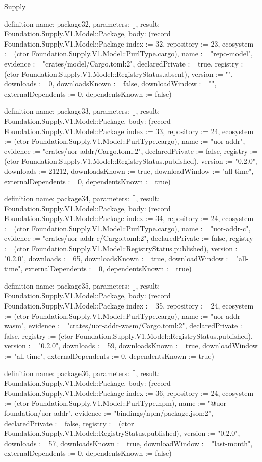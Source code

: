 \begin{lexlean}{Supply}
\begin{semanticmodule}
definition{
  name: package32,
  parameters: [],
  result: Foundation.Supply.V1.Model::Package,
  body: (record Foundation.Supply.V1.Model::Package {index := 32, repository := 23, ecosystem := (ctor Foundation.Supply.V1.Model::PurlType.cargo), name := "repo-model", evidence := "crates/model/Cargo.toml:2", declaredPrivate := true, registry := (ctor Foundation.Supply.V1.Model::RegistryStatus.absent), version := "", downloads := 0, downloadsKnown := false, downloadWindow := "", externalDependents := 0, dependentsKnown := false})
}

definition{
  name: package33,
  parameters: [],
  result: Foundation.Supply.V1.Model::Package,
  body: (record Foundation.Supply.V1.Model::Package {index := 33, repository := 24, ecosystem := (ctor Foundation.Supply.V1.Model::PurlType.cargo), name := "uor-addr", evidence := "crates/uor-addr/Cargo.toml:2", declaredPrivate := false, registry := (ctor Foundation.Supply.V1.Model::RegistryStatus.published), version := "0.2.0", downloads := 21212, downloadsKnown := true, downloadWindow := "all-time", externalDependents := 0, dependentsKnown := true})
}

definition{
  name: package34,
  parameters: [],
  result: Foundation.Supply.V1.Model::Package,
  body: (record Foundation.Supply.V1.Model::Package {index := 34, repository := 24, ecosystem := (ctor Foundation.Supply.V1.Model::PurlType.cargo), name := "uor-addr-c", evidence := "crates/uor-addr-c/Cargo.toml:2", declaredPrivate := false, registry := (ctor Foundation.Supply.V1.Model::RegistryStatus.published), version := "0.2.0", downloads := 65, downloadsKnown := true, downloadWindow := "all-time", externalDependents := 0, dependentsKnown := true})
}

definition{
  name: package35,
  parameters: [],
  result: Foundation.Supply.V1.Model::Package,
  body: (record Foundation.Supply.V1.Model::Package {index := 35, repository := 24, ecosystem := (ctor Foundation.Supply.V1.Model::PurlType.cargo), name := "uor-addr-wasm", evidence := "crates/uor-addr-wasm/Cargo.toml:2", declaredPrivate := false, registry := (ctor Foundation.Supply.V1.Model::RegistryStatus.published), version := "0.2.0", downloads := 59, downloadsKnown := true, downloadWindow := "all-time", externalDependents := 0, dependentsKnown := true})
}

definition{
  name: package36,
  parameters: [],
  result: Foundation.Supply.V1.Model::Package,
  body: (record Foundation.Supply.V1.Model::Package {index := 36, repository := 24, ecosystem := (ctor Foundation.Supply.V1.Model::PurlType.npm), name := "@uor-foundation/uor-addr", evidence := "bindings/npm/package.json:2", declaredPrivate := false, registry := (ctor Foundation.Supply.V1.Model::RegistryStatus.published), version := "0.2.0", downloads := 57, downloadsKnown := true, downloadWindow := "last-month", externalDependents := 0, dependentsKnown := false})
}


\end{semanticmodule}
\end{lexlean}
